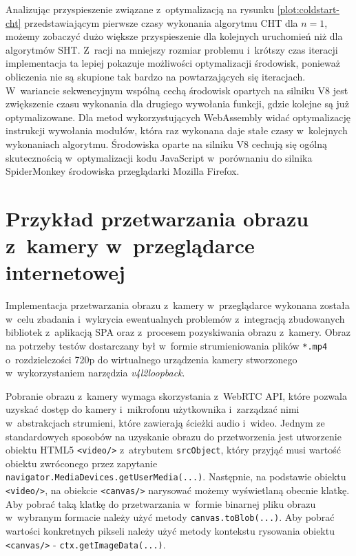Analizując przyspieszenie związane z~optymalizacją na rysunku \ref{plot:coldstart-cht} przedstawiającym pierwsze czasy wykonania algorytmu CHT dla $n=1$, możemy zobaczyć dużo większe przyspieszenie dla kolejnych uruchomień niż dla algorytmów SHT. Z~racji na mniejszy rozmiar problemu i~krótszy czas iteracji implementacja ta lepiej pokazuje możliwości optymalizacji środowisk, ponieważ obliczenia nie są skupione tak bardzo na powtarzających się iteracjach. W~wariancie sekwencyjnym wspólną cechą środowisk opartych na silniku V8 jest zwiększenie czasu wykonania dla drugiego wywołania funkcji, gdzie kolejne są już optymalizowane. Dla metod wykorzystujących WebAssembly widać optymalizację instrukcji wywołania modułów, która raz wykonana daje stałe czasy w~kolejnych wykonaniach algorytmu. Środowiska oparte na silniku V8 cechują się ogólną skutecznością w~optymalizacji kodu JavaScript w~porównaniu do silnika SpiderMonkey środowiska przeglądarki Mozilla Firefox.

\section{Przykład przetwarzania obrazu z~kamery w~przeglądarce internetowej}

Implementacja przetwarzania obrazu z~kamery w~przeglądarce wykonana została w~celu zbadania i~wykrycia ewentualnych problemów z~integracją zbudowanych bibliotek z~aplikacją SPA oraz z~procesem pozyskiwania obrazu z~kamery. Obraz na potrzeby testów dostarczany był w~formie strumieniowania plików \lstinline{*.mp4} o~rozdzielczości 720p do wirtualnego urządzenia kamery stworzonego w~wykorzystaniem narzędzia \textit{v4l2loopback}.

Pobranie obrazu z~kamery wymaga skorzystania z~WebRTC API, które pozwala uzyskać dostęp do kamery i~mikrofonu użytkownika i~zarządzać nimi w~abstrakcjach strumieni, które zawierają ścieżki audio i~wideo. Jednym ze standardowych sposobów na uzyskanie obrazu do przetworzenia jest utworzenie obiektu HTML5 \lstinline{<video/>} z~atrybutem \lstinline{srcObject}, który przyjąć musi wartość obiektu zwróconego przez zapytanie \lstinline{navigator.MediaDevices.getUserMedia(...)}. Następnie, na podstawie obiektu \lstinline{<video/>}, na obiekcie \lstinline{<canvas/>} narysować możemy wyświetlaną obecnie klatkę. Aby pobrać taką klatkę do przetwarzania w~formie binarnej pliku obrazu w~wybranym formacie należy użyć metody \lstinline{canvas.toBlob(...)}. Aby pobrać wartości konkretnych pikseli należy użyć metody kontekstu rysowania obiektu \lstinline{<canvas/>} - \lstinline{ctx.getImageData(...)}. 

